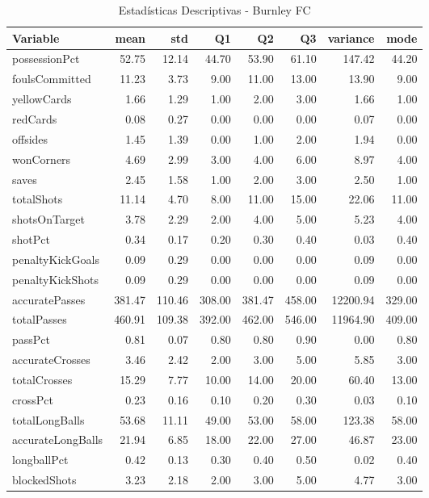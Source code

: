 \begin{table}[H]
\centering
\caption{Estadísticas Descriptivas - Burnley FC}
\label{tab:eng_burnley}
\small
\begin{tabular}{lrrrrrrr}
\hline
Variable & mean & std & Q1 & Q2 & Q3 & variance & mode \\
\hline
possessionPct & 52.75 & 12.14 & 44.70 & 53.90 & 61.10 & 147.42 & 44.20 \\
foulsCommitted & 11.23 & 3.73 & 9.00 & 11.00 & 13.00 & 13.90 & 9.00 \\
yellowCards & 1.66 & 1.29 & 1.00 & 2.00 & 3.00 & 1.66 & 1.00 \\
redCards & 0.08 & 0.27 & 0.00 & 0.00 & 0.00 & 0.07 & 0.00 \\
offsides & 1.45 & 1.39 & 0.00 & 1.00 & 2.00 & 1.94 & 0.00 \\
wonCorners & 4.69 & 2.99 & 3.00 & 4.00 & 6.00 & 8.97 & 4.00 \\
saves & 2.45 & 1.58 & 1.00 & 2.00 & 3.00 & 2.50 & 1.00 \\
totalShots & 11.14 & 4.70 & 8.00 & 11.00 & 15.00 & 22.06 & 11.00 \\
shotsOnTarget & 3.78 & 2.29 & 2.00 & 4.00 & 5.00 & 5.23 & 4.00 \\
shotPct & 0.34 & 0.17 & 0.20 & 0.30 & 0.40 & 0.03 & 0.40 \\
penaltyKickGoals & 0.09 & 0.29 & 0.00 & 0.00 & 0.00 & 0.09 & 0.00 \\
penaltyKickShots & 0.09 & 0.29 & 0.00 & 0.00 & 0.00 & 0.09 & 0.00 \\
accuratePasses & 381.47 & 110.46 & 308.00 & 381.47 & 458.00 & 12200.94 & 329.00 \\
totalPasses & 460.91 & 109.38 & 392.00 & 462.00 & 546.00 & 11964.90 & 409.00 \\
passPct & 0.81 & 0.07 & 0.80 & 0.80 & 0.90 & 0.00 & 0.80 \\
accurateCrosses & 3.46 & 2.42 & 2.00 & 3.00 & 5.00 & 5.85 & 3.00 \\
totalCrosses & 15.29 & 7.77 & 10.00 & 14.00 & 20.00 & 60.40 & 13.00 \\
crossPct & 0.23 & 0.16 & 0.10 & 0.20 & 0.30 & 0.03 & 0.10 \\
totalLongBalls & 53.68 & 11.11 & 49.00 & 53.00 & 58.00 & 123.38 & 58.00 \\
accurateLongBalls & 21.94 & 6.85 & 18.00 & 22.00 & 27.00 & 46.87 & 23.00 \\
longballPct & 0.42 & 0.13 & 0.30 & 0.40 & 0.50 & 0.02 & 0.40 \\
blockedShots & 3.23 & 2.18 & 2.00 & 3.00 & 5.00 & 4.77 & 3.00 \\

\end{tabular}
\end{table}
